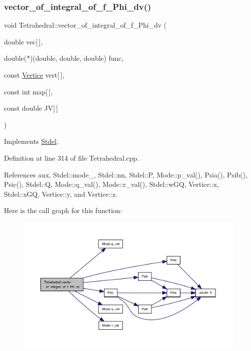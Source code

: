 \subsubsection{\texorpdfstring{vector\+\_\+of\+\_\+integral\+\_\+of\+\_\+f\+\_\+\+Phi\+\_\+dv()}{vector\_of\_integral\_of\_f\_Phi\_dv()}\hspace{0.1cm}{\footnotesize\ttfamily [2/2]}}
{\footnotesize\ttfamily void Tetrahedral\+::vector\+\_\+of\+\_\+integral\+\_\+of\+\_\+f\+\_\+\+Phi\+\_\+dv (\begin{DoxyParamCaption}\item[{double}]{vec\mbox{[}$\,$\mbox{]},  }\item[{double($\ast$)(double, double, double)}]{func,  }\item[{const \hyperlink{structVertice}{Vertice}}]{vert\mbox{[}$\,$\mbox{]},  }\item[{const int}]{map\mbox{[}$\,$\mbox{]},  }\item[{const double}]{JV\mbox{[}$\,$\mbox{]} }\end{DoxyParamCaption})\hspace{0.3cm}{\ttfamily [virtual]}}



Implements \hyperlink{classStdel_a3a22725f255ab04520ce1744eef8e2c0}{Stdel}.



Definition at line 314 of file Tetrahedral.\+cpp.



References aux, Stdel\+::mode\+\_\+, Stdel\+::nn, Stdel\+::P, Mode\+::p\+\_\+val(), Psia(), Psib(), Psic(), Stdel\+::Q, Mode\+::q\+\_\+val(), Mode\+::r\+\_\+val(), Stdel\+::w\+GQ, Vertice\+::x, Stdel\+::x\+GQ, Vertice\+::y, and Vertice\+::z.

Here is the call graph for this function\+:
\nopagebreak
\begin{figure}[H]
\begin{center}
\leavevmode
\includegraphics[width=350pt]{classTetrahedral_af8d3f23744224a67aaaebe66f427678f_cgraph}
\end{center}
\end{figure}
\mbox{\label{classStdel_a395c8d7d7890a9efdea23932fa22b420}} 
